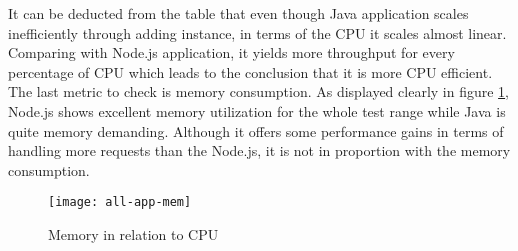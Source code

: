 It can be deducted from the table that even though Java application scales inefficiently through adding instance, in terms of the CPU it scales almost linear. Comparing with Node.js application, it yields more throughput for every percentage of CPU which leads to the conclusion that it is more CPU efficient. \\
The last metric to check is memory consumption. As displayed clearly in figure \ref{all-app-memory}, Node.js shows excellent memory utilization for the whole test range while Java is quite memory demanding. Although it offers some performance gains in terms of handling more requests than the Node.js, it is not in proportion with the memory consumption. 
 \begin{figure}[h]
	\centering
	\texttt{[image: all-app-mem]}
	\caption{Memory in relation to CPU}
	\label{all-app-memory}
\end{figure}